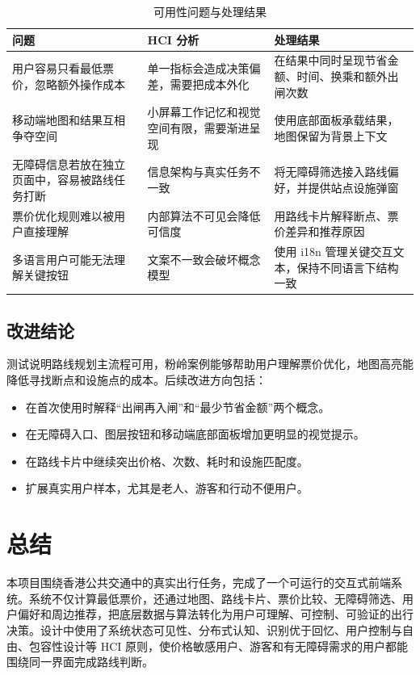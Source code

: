 \documentclass[UTF8,a4paper,11pt]{ctexart}
\begin{document}
\begin{table}[H]
  \centering
  \caption{可用性问题与处理结果}
  \begin{tabularx}{\textwidth}{p{}YY}
    \toprule
    问题 & HCI 分析 & 处理结果 \\
    \midrule
    用户容易只看最低票价，忽略额外操作成本 & 单一指标会造成决策偏差，需要把成本外化 & 在结果中同时呈现节省金额、时间、换乘和额外出闸次数 \\
    移动端地图和结果互相争夺空间 & 小屏幕工作记忆和视觉空间有限，需要渐进呈现 & 使用底部面板承载结果，地图保留为背景上下文 \\
    无障碍信息若放在独立页面中，容易被路线任务打断 & 信息架构与真实任务不一致 & 将无障碍筛选接入路线偏好，并提供站点设施弹窗 \\
    票价优化规则难以被用户直接理解 & 内部算法不可见会降低可信度 & 用路线卡片解释断点、票价差异和推荐原因 \\
    多语言用户可能无法理解关键按钮 & 文案不一致会破坏概念模型 & 使用 i18n 管理关键交互文本，保持不同语言下结构一致 \\
    \bottomrule
  \end{tabularx}
\end{table}

\subsection{改进结论}

测试说明路线规划主流程可用，粉岭案例能够帮助用户理解票价优化，地图高亮能降低寻找断点和设施点的成本。后续改进方向包括：
\begin{itemize}
  \item 在首次使用时解释“出闸再入闸”和“最少节省金额”两个概念。
  \item 在无障碍入口、图层按钮和移动端底部面板增加更明显的视觉提示。
  \item 在路线卡片中继续突出价格、次数、耗时和设施匹配度。
  \item 扩展真实用户样本，尤其是老人、游客和行动不便用户。
\end{itemize}

\section{总结}

本项目围绕香港公共交通中的真实出行任务，完成了一个可运行的交互式前端系统。系统不仅计算最低票价，还通过地图、路线卡片、票价比较、无障碍筛选、用户偏好和周边推荐，把底层数据与算法转化为用户可理解、可控制、可验证的出行决策。设计中使用了系统状态可见性、分布式认知、识别优于回忆、用户控制与自由、包容性设计等 HCI 原则，使价格敏感用户、游客和有无障碍需求的用户都能围绕同一界面完成路线判断。
\end{document}
